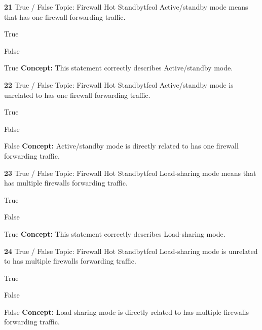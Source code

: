 \documentclass[10pt,a4paper]{article}
\begin{document}
\begin{qcard}{\color{white}\textbf{21} \hfill \small True / False \textbar{} Topic: Firewall Hot Standby}{tfcol}
Active/standby mode means that has one firewall forwarding traffic.

\begin{qoptions}
\item True
\item False
\end{qoptions}
\begin{explainbox}{True}
\textbf{Concept:} This statement correctly describes Active/standby mode.
\end{explainbox}
\end{qcard}

\begin{qcard}{\color{white}\textbf{22} \hfill \small True / False \textbar{} Topic: Firewall Hot Standby}{tfcol}
Active/standby mode is unrelated to has one firewall forwarding traffic.

\begin{qoptions}
\item True
\item False
\end{qoptions}
\begin{explainbox}{False}
\textbf{Concept:} Active/standby mode is directly related to has one firewall forwarding traffic.
\end{explainbox}
\end{qcard}

\begin{qcard}{\color{white}\textbf{23} \hfill \small True / False \textbar{} Topic: Firewall Hot Standby}{tfcol}
Load-sharing mode means that has multiple firewalls forwarding traffic.

\begin{qoptions}
\item True
\item False
\end{qoptions}
\begin{explainbox}{True}
\textbf{Concept:} This statement correctly describes Load-sharing mode.
\end{explainbox}
\end{qcard}

\begin{qcard}{\color{white}\textbf{24} \hfill \small True / False \textbar{} Topic: Firewall Hot Standby}{tfcol}
Load-sharing mode is unrelated to has multiple firewalls forwarding traffic.

\begin{qoptions}
\item True
\item False
\end{qoptions}
\begin{explainbox}{False}
\textbf{Concept:} Load-sharing mode is directly related to has multiple firewalls forwarding traffic.
\end{explainbox}
\end{qcard}
\end{document}
